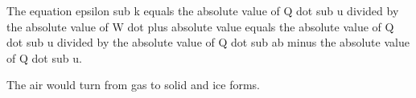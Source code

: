 The equation epsilon sub k equals the absolute value of Q dot sub u divided by the absolute value of W dot plus absolute value equals the absolute value of Q dot sub u divided by the absolute value of Q dot sub ab minus the absolute value of Q dot sub u.

The air would turn from gas to solid and ice forms.